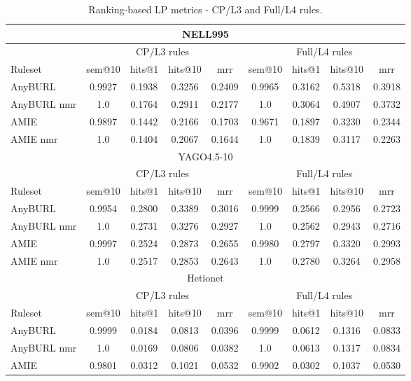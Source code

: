 \documentclass[a4paper,UKenglish,cleveref, autoref, thm-restate]{tgdk-v2021}
\begin{document}
\begin{table}[h]
\centering
\caption{Ranking-based LP metrics - CP/L3 and Full/L4 rules.}
\label{tab:metrics_rank}
\begin{tabular}{l | c | c c c | c | c c c}
\toprule
\multicolumn{9}{c}{NELL995} \\
\midrule
& \multicolumn{4}{c|}{CP/L3 rules} & \multicolumn{4}{c}{Full/L4 rules} \\
\cmidrule(lr){2-5} \cmidrule(lr){6-9}
Ruleset & sem@10 & hits@1 & hits@10 & mrr & sem@10 & hits@1 & hits@10 & mrr \\
\midrule
AnyBURL & 0.9927 & 0.1938 & 0.3256 & 0.2409 & 0.9965 & 0.3162 & 0.5318 & 0.3918 \\
AnyBURL nmr & 1.0 & 0.1764 & 0.2911 & 0.2177 & 1.0 & 0.3064 & 0.4907 & 0.3732 \\
AMIE & 0.9897 & 0.1442 & 0.2166 & 0.1703 & 0.9671 & 0.1897 & 0.3230 & 0.2344 \\
AMIE nmr & 1.0 & 0.1404 & 0.2067 & 0.1644 & 1.0 &  0.1839 & 0.3117 & 0.2263 \\
\midrule
\multicolumn{9}{c}{YAGO4.5-10} \\
\midrule
& \multicolumn{4}{c|}{CP/L3 rules} & \multicolumn{4}{c}{Full/L4 rules} \\
\cmidrule(lr){2-5} \cmidrule(lr){6-9}
Ruleset & sem@10 & hits@1 & hits@10 & mrr & sem@10 & hits@1 & hits@10 & mrr \\
\midrule
AnyBURL & 0.9954 & 0.2800 & 0.3389 & 0.3016 & 0.9999 & 0.2566 & 0.2956 & 0.2723 \\
AnyBURL nmr & 1.0 & 0.2731 & 0.3276 & 0.2927 & 1.0 & 0.2562 & 0.2943 & 0.2716 \\
AMIE & 0.9997 & 0.2524 & 0.2873 & 0.2655 & 0.9980 & 0.2797 & 0.3320 & 0.2993\\
AMIE nmr & 1.0 & 0.2517 & 0.2853 & 0.2643 & 1.0 & 0.2780 & 0.3264 & 0.2958\\
\midrule
\multicolumn{9}{c}{Hetionet} \\
\midrule
& \multicolumn{4}{c|}{CP/L3 rules} & \multicolumn{4}{c}{Full/L4 rules} \\
\cmidrule(lr){2-5} \cmidrule(lr){6-9}
Ruleset & sem@10 & hits@1 & hits@10 & mrr & sem@10 & hits@1 & hits@10 & mrr \\
\midrule
AnyBURL  & 0.9999 & 0.0184 & 0.0813 & 0.0396 & 0.9999 & 0.0612 & 0.1316 & 0.0833 \\
AnyBURL nmr & 1.0 & 0.0169 & 0.0806 & 0.0382 & 1.0 & 0.0613 & 0.1317 & 0.0834\\
AMIE & 0.9801 & 0.0312 & 0.1021 & 0.0532 & 0.9902 & 0.0302 & 0.1037 & 0.0530 \\

\end{tabular}
\end{table}
\end{document}
